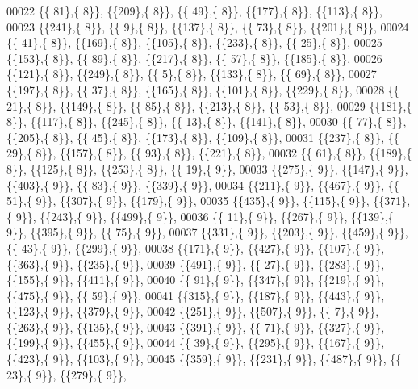 \begin{DoxyCode}
00022 \{\{ 81\},\{  8\}\}, \{\{209\},\{  8\}\}, \{\{ 49\},\{  8\}\}, \{\{177\},\{  8\}\}, \{\{113\},\{  8\}\},
00023 \{\{241\},\{  8\}\}, \{\{  9\},\{  8\}\}, \{\{137\},\{  8\}\}, \{\{ 73\},\{  8\}\}, \{\{201\},\{  8\}\},
00024 \{\{ 41\},\{  8\}\}, \{\{169\},\{  8\}\}, \{\{105\},\{  8\}\}, \{\{233\},\{  8\}\}, \{\{ 25\},\{  8\}\},
00025 \{\{153\},\{  8\}\}, \{\{ 89\},\{  8\}\}, \{\{217\},\{  8\}\}, \{\{ 57\},\{  8\}\}, \{\{185\},\{  8\}\},
00026 \{\{121\},\{  8\}\}, \{\{249\},\{  8\}\}, \{\{  5\},\{  8\}\}, \{\{133\},\{  8\}\}, \{\{ 69\},\{  8\}\},
00027 \{\{197\},\{  8\}\}, \{\{ 37\},\{  8\}\}, \{\{165\},\{  8\}\}, \{\{101\},\{  8\}\}, \{\{229\},\{  8\}\},
00028 \{\{ 21\},\{  8\}\}, \{\{149\},\{  8\}\}, \{\{ 85\},\{  8\}\}, \{\{213\},\{  8\}\}, \{\{ 53\},\{  8\}\},
00029 \{\{181\},\{  8\}\}, \{\{117\},\{  8\}\}, \{\{245\},\{  8\}\}, \{\{ 13\},\{  8\}\}, \{\{141\},\{  8\}\},
00030 \{\{ 77\},\{  8\}\}, \{\{205\},\{  8\}\}, \{\{ 45\},\{  8\}\}, \{\{173\},\{  8\}\}, \{\{109\},\{  8\}\},
00031 \{\{237\},\{  8\}\}, \{\{ 29\},\{  8\}\}, \{\{157\},\{  8\}\}, \{\{ 93\},\{  8\}\}, \{\{221\},\{  8\}\},
00032 \{\{ 61\},\{  8\}\}, \{\{189\},\{  8\}\}, \{\{125\},\{  8\}\}, \{\{253\},\{  8\}\}, \{\{ 19\},\{  9\}\},
00033 \{\{275\},\{  9\}\}, \{\{147\},\{  9\}\}, \{\{403\},\{  9\}\}, \{\{ 83\},\{  9\}\}, \{\{339\},\{  9\}\},
00034 \{\{211\},\{  9\}\}, \{\{467\},\{  9\}\}, \{\{ 51\},\{  9\}\}, \{\{307\},\{  9\}\}, \{\{179\},\{  9\}\},
00035 \{\{435\},\{  9\}\}, \{\{115\},\{  9\}\}, \{\{371\},\{  9\}\}, \{\{243\},\{  9\}\}, \{\{499\},\{  9\}\},
00036 \{\{ 11\},\{  9\}\}, \{\{267\},\{  9\}\}, \{\{139\},\{  9\}\}, \{\{395\},\{  9\}\}, \{\{ 75\},\{  9\}\},
00037 \{\{331\},\{  9\}\}, \{\{203\},\{  9\}\}, \{\{459\},\{  9\}\}, \{\{ 43\},\{  9\}\}, \{\{299\},\{  9\}\},
00038 \{\{171\},\{  9\}\}, \{\{427\},\{  9\}\}, \{\{107\},\{  9\}\}, \{\{363\},\{  9\}\}, \{\{235\},\{  9\}\},
00039 \{\{491\},\{  9\}\}, \{\{ 27\},\{  9\}\}, \{\{283\},\{  9\}\}, \{\{155\},\{  9\}\}, \{\{411\},\{  9\}\},
00040 \{\{ 91\},\{  9\}\}, \{\{347\},\{  9\}\}, \{\{219\},\{  9\}\}, \{\{475\},\{  9\}\}, \{\{ 59\},\{  9\}\},
00041 \{\{315\},\{  9\}\}, \{\{187\},\{  9\}\}, \{\{443\},\{  9\}\}, \{\{123\},\{  9\}\}, \{\{379\},\{  9\}\},
00042 \{\{251\},\{  9\}\}, \{\{507\},\{  9\}\}, \{\{  7\},\{  9\}\}, \{\{263\},\{  9\}\}, \{\{135\},\{  9\}\},
00043 \{\{391\},\{  9\}\}, \{\{ 71\},\{  9\}\}, \{\{327\},\{  9\}\}, \{\{199\},\{  9\}\}, \{\{455\},\{  9\}\},
00044 \{\{ 39\},\{  9\}\}, \{\{295\},\{  9\}\}, \{\{167\},\{  9\}\}, \{\{423\},\{  9\}\}, \{\{103\},\{  9\}\},
00045 \{\{359\},\{  9\}\}, \{\{231\},\{  9\}\}, \{\{487\},\{  9\}\}, \{\{ 23\},\{  9\}\}, \{\{279\},\{  9\}\},

\end{DoxyCode}
